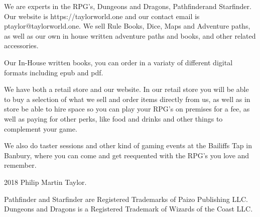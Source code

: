 \documentclass[12pt,a4paper]{book}
\begin{document}
\begin{flushleft}
We are experts in the RPG's, Dungeons and Dragons\textregistered{}, Pathfinder\textregistered{}\:and Starfinder\textregistered{}. Our website is https://taylorworld.one and our contact email is ptaylor@taylorworld.one.
We sell Rule Books, Dice, Maps and Adventure paths, as well as our own in house written adventure paths and books, and other related accessories.
\end{flushleft}
\begin{flushleft}
Our In-House written books, you can order in a variaty of different digital formats including epub and pdf.
\end{flushleft}
\begin{flushleft}
We have both a retail store and our website. In our retail store you will be able to buy a selection of what we sell and order items directly from us, as well as in store be able to hire space so you can play your RPG's on premises for a fee, as well as paying for other perks, like food and drinks and other things to complement your game.
\end{flushleft}
\begin{flushleft}
  We also do taster sessions and other kind of gaming events at the Bailiffs Tap in Banbury, where you can come and get reequented with the RPG's you love and remember.
\end{flushleft}
\begin{center}
  \textcopyright{} 2018 Philip Martin Taylor.
\end{center}
\begin{center}
  Pathfinder and Starfinder are Registered Trademarks of Paizo Publishing LLC. Dungeons and Dragons is a Registered Trademark of Wizards of the Coast LLC.
\end{center}
\end{document}
